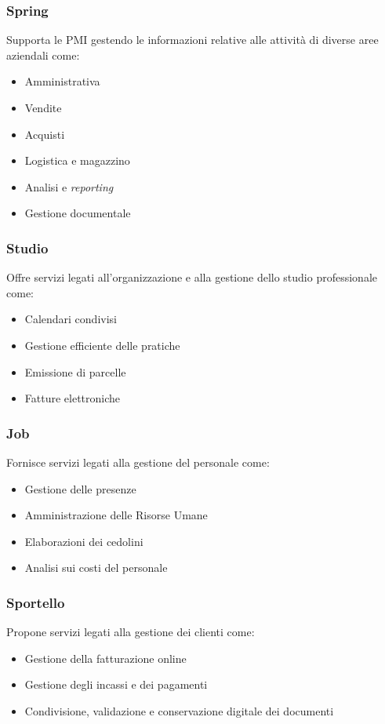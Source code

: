 \subsubsection*{Spring}
Supporta le \gls{PMI} gestendo le informazioni relative alle attività di diverse aree aziendali come: 

\begin{itemize}
    \item Amministrativa 
    \item Vendite 
    \item Acquisti 
    \item Logistica e magazzino
    \item Analisi e \emph{reporting}
    \item Gestione documentale
\end{itemize}

\subsubsection*{Studio}
Offre servizi legati all'organizzazione e alla gestione dello studio professionale come:
\begin{itemize}
    \item Calendari condivisi  
    \item Gestione efficiente delle pratiche 
    \item Emissione di parcelle  
    \item Fatture elettroniche 
\end{itemize}

\subsubsection*{Job}
Fornisce servizi legati alla gestione del personale come: 
\begin{itemize}
    \item Gestione delle presenze  
    \item Amministrazione delle Risorse Umane  
    \item Elaborazioni dei cedolini 
    \item Analisi sui costi del personale
\end{itemize}

\subsubsection*{Sportello}
Propone servizi legati alla gestione dei clienti come:  
\begin{itemize}
    \item Gestione della fatturazione online 
    \item Gestione degli incassi e dei pagamenti 
    \item Condivisione, validazione e conservazione digitale dei documenti  
\end{itemize}

